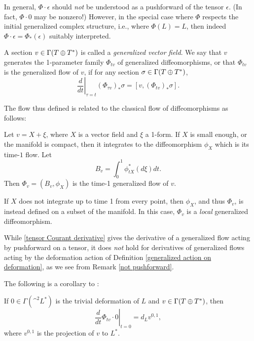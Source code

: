 \documentclass{article}
\begin{document}
\begin{rem}\label{not pushforward}
In general, $\Phi\cdot\epsilon$ should \emph{not} be understood as a pushforward of the tensor $\epsilon$.  (In fact, $\Phi\cdot0$ may be nonzero!)  However, in the special case where $\Phi$ respects the initial generalized complex structure, i.e., where $\Phi(L)=L$, then indeed $\Phi\cdot\epsilon = \Phi_*(\epsilon)$ suitably interpreted.
\end{rem}

\begin{defn}\label{generalized flow}
A section $v \in \Gamma(T\oplus T^*)$ is called a \emph{generalized vector field}.  We say that $v$ generates the 1-parameter family $\Phi_{tv}$ of generalized diffeomorphisms, or that $\Phi_{tv}$ is the generalized flow of $v$, if for any section $\sigma\in \Gamma(T\oplus T^*)$,
\begin{equation}\label{tensor Courant derivative}
\left.\frac{d}{dt}\right|_{\tau=t}\left(\Phi_{\tau v}\right)_*\sigma = [v,\left(\Phi_{tv}\right)_*\sigma].
\end{equation}
\end{defn}

The flow thus defined is related to the classical flow of diffeomorphisms as follows:

Let $v = X + \xi$, where $X$ is a vector field and $\xi$ a 1-form.  If $X$ is small enough, or the manifold is compact, then it integrates to the diffeomorphism $\phi_X$ which is its time-$1$ flow.  Let
$$B_v = \int_0^1 \phi_{tX}^* (d\xi) dt.$$
Then $\Phi_v = (B_v, \phi_X)$ is the time-1 generalized flow of $v$.

\begin{rem}
If $X$ does not integrate up to time 1 from every point, then $\phi_X$, and thus $\Phi_v$, is instead defined on a subset of the manifold.  In this case, $\Phi_v$ is a \emph{local} generalized diffeomorphism.
\end{rem}

\begin{rem}
While \eqref{tensor Courant derivative} gives the derivative of a generalized flow acting by pushforward on a tensor, it does \emph{not} hold for derivatives of generalized flows acting by the deformation action of Definition \ref{generalized action on deformation}, as we see from Remark \ref{not pushforward}.
\end{rem}

The following is a corollary to \cite[Prop. 5.4]{Gualtieri2011}: 
\begin{lem}
If $0 \in \Gamma(\^ ^2 L^*)$ is the trivial deformation of $L$ and $v \in \Gamma(T\oplus T^*)$, then
$$\left.\frac{d}{dt}\Phi_{tv}\cdot 0\right|_{t=0} = d_L v^{0,1},$$
where $v^{0,1}$ is the projection of $v$ to $L^*$.
\end{lem}
\end{document}
